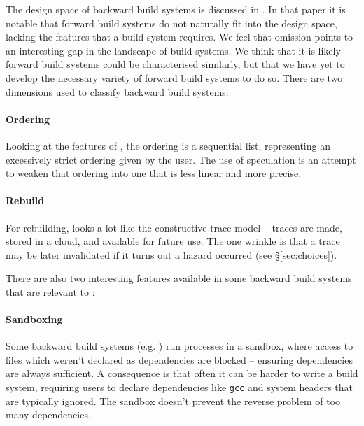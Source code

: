 The design space of backward build systems is discussed in \cite{build_systems_a_la_carte}. In that paper it is notable that forward build systems do not naturally fit into the design space, lacking the features that a build system requires. We feel that omission points to an interesting gap in the landscape of build systems. We think that it is likely forward build systems could be characterised similarly, but that we have yet to develop the necessary variety of forward build systems to do so. There are two dimensions used to classify backward build systems:

\paragraph{Ordering} Looking at the features of \Rattle, the ordering is a sequential list, representing an excessively strict ordering given by the user. The use of speculation is an attempt to weaken that ordering into one that is less linear and more precise.

\paragraph{Rebuild} For rebuilding, \Rattle looks a lot like the constructive trace model -- traces are made, stored in a cloud, and available for future use. The one wrinkle is that a trace may be later invalidated if it turns out a hazard occurred (see \S\ref{sec:choices}).

\postparagraphs

There are also two interesting features available in some backward build systems that are relevant to \Rattle:

\paragraph{Sandboxing} Some backward build systems (e.g. \Bazel \cite{bazel}) run processes in a sandbox, where access to files which weren't declared as dependencies are blocked -- ensuring dependencies are always sufficient. A consequence is that often it can be harder to write a \Bazel build system, requiring users to declare dependencies like \texttt{gcc} and system headers that are typically ignored. The sandbox doesn't prevent the reverse problem of too many dependencies.

